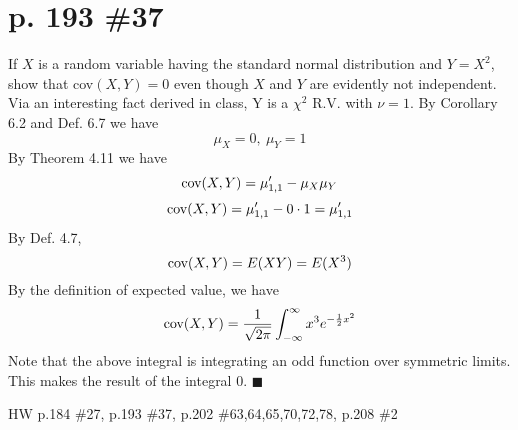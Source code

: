 \documentclass[12pt]{article}
\begin{document}
	\section[20pt]{p. 193 \#37}
	If \(X\) is a random variable having the standard normal distribution and \(Y=X^2\), show that cov\((X,Y)=0\) even though \(X\) and \(Y\) are evidently not independent. \newline \newline
	Via an interesting fact derived in class, Y is a \(\chi^2\) R.V. with \(\nu=1\). \newline \newline
	By Corollary 6.2 and Def. 6.7 we have
	\[\mu_X=0,\ \mu_Y=1\]
	By Theorem 4.11 we have
	\[\textup{cov}(X,Y)=\mu_{1,1}'-\mu_X\mu_Y\]
	\[\textup{cov}(X,Y)=\mu_{1,1}'-0\cdot 1=\mu_{1,1}'\]
	By Def. 4.7,
	\[\textup{cov}(X,Y)=E(XY)=E(X^3)\]
	By the definition of expected value, we have
	\[\textup{cov}(X,Y)=\frac{1}{\sqrt{2\pi}}\int_{-\infty}^{\infty}x^3e^{-\frac{1}{2}x^2}\]
	Note that the above integral is integrating an odd function over symmetric limits. This makes the result of the integral 0. \newline
	 \newline \newline
	\(\blacksquare\)
	\newpage
	\maketitle HW p.184 \#27, p.193 \#37, p.202 \#63,64,65,70,72,78, p.208 \#2
\end{document}
